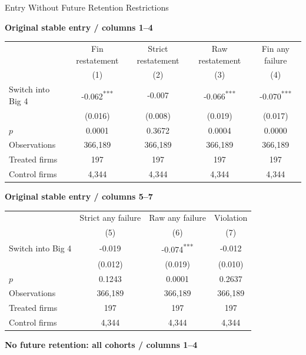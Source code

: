 \documentclass[10pt]{article}
\newcommand{\sym}[1]{\textsuperscript{#1}}
\begin{document}
\fontsize{10}{12}\selectfont
\setlength{\tabcolsep}{3pt}\renewcommand{\arraystretch}{1.15}
\begin{center}\large Entry Without Future Retention Restrictions\end{center}
\medskip\textbf{Original stable entry / columns 1--4}\par\smallskip
\begin{tabular*}{\textwidth}{@{\extracolsep{\fill}}lcccc@{}}
\toprule
 & Fin restatement & Strict restatement & Raw restatement & Fin any failure \\
 & (1) & (2) & (3) & (4) \\
\midrule
Switch into Big 4 & -0.062\sym{***} & -0.007 & -0.066\sym{***} & -0.070\sym{***} \\
 & (0.016) & (0.008) & (0.019) & (0.017) \\
$p$ & 0.0001 & 0.3672 & 0.0004 & 0.0000 \\
Observations & 366,189 & 366,189 & 366,189 & 366,189 \\
Treated firms & 197 & 197 & 197 & 197 \\
Control firms & 4,344 & 4,344 & 4,344 & 4,344 \\
\bottomrule\end{tabular*}\par
\medskip\textbf{Original stable entry / columns 5--7}\par\smallskip
\begin{tabular*}{\textwidth}{@{\extracolsep{\fill}}lccc@{}}
\toprule
 & Strict any failure & Raw any failure & Violation \\
 & (5) & (6) & (7) \\
\midrule
Switch into Big 4 & -0.019 & -0.074\sym{***} & -0.012 \\
 & (0.012) & (0.019) & (0.010) \\
$p$ & 0.1243 & 0.0001 & 0.2637 \\
Observations & 366,189 & 366,189 & 366,189 \\
Treated firms & 197 & 197 & 197 \\
Control firms & 4,344 & 4,344 & 4,344 \\
\bottomrule\end{tabular*}\par
\medskip\textbf{No future retention: all cohorts / columns 1--4}\par\smallskip
\end{document}
